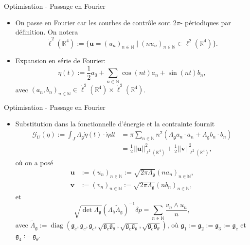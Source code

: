 \documentclass[10pt, envcountsect]{beamer}
\theoremstyle{plain}
\newcommand{\N}{\mathbb{N}}
\newcommand{\R}{\mathbb{R}}
\DeclareMathOperator{\diag}{diag}
\begin{document}
\begin{frame}{Optimisation - Passage en Fourier}
\begin{itemize}
\item On passe en Fourier car les courbes de contrôle sont $2 \pi$- périodiques par définition. On notera
\begin{equation}
\dot{\ell}^2(\R^4) := \{\mathbf{u} = (u_n)_{n \in \N} \mid (n u_n)_{n \in \N} \in \ell^2(\R^4)\}.
\end{equation}

\item Expansion en série de Fourier:
\begin{equation}
\eta(t) := \frac{1}{2} a_0 + \sum_{n \in \N} \cos(nt) a_n + \sin(n t) b_n,
\end{equation}
avec $(a_n, b_n)_{n \in \N} \in \dot{\ell}^2(\R^4) \times \dot{\ell}^2(\R^4)$.
\end{itemize}
\end{frame}

\begin{frame}{Optimisation - Passage en Fourier}
\begin{itemize}
\item Substitution dans la fonctionnelle d'énergie et la contrainte fournit
\begin{align}
\mathcal{G}_{U} (\eta) := \int_{J} \Lambda_{\mathfrak{g}} \dot{\eta}(t) \cdot \dot{\eta} dt &= \pi \sum_{n  \in \N} n^2(\Lambda_{\mathfrak{g}} a_n \cdot a_n + \Lambda_{\mathfrak{g}} b_n \cdot b_n)  \\  &=
\frac{1}{2} ||\mathbf{u}||_{\ell^2(\R^4)}^2 + \frac{1}{2} ||\mathbf{v}||_{\ell^2(\R^4)}^2,
\end{align}
où on a posé
\begin{align}
\label{eq:relation Fourier coeffs of eta}
	\mathbf{u} &:= (u_n)_{n \in \N} := \sqrt{2 \pi \Lambda_{\mathfrak{g}}}(n a_n)_{n \in \N},\\
	\mathbf{v} &:= (v_n)_{n \in \N} := \sqrt{2 \pi \Lambda_{\mathfrak{g}}} (n b_n)_{n \in \N},
\end{align}
et
\begin{equation}
\sqrt{\det \Lambda_{\mathfrak{g}}} (\Lambda_{\mathfrak{h}} \tilde{\Lambda}_{\mathfrak{g}})^{-1} \delta p = \sum_{n \in \N} \frac{v_n  \wedge u_n}{n},
\end{equation}
avec $\tilde{\Lambda}_{\mathfrak{g}} := \diag(\mathfrak{g}_c, \mathfrak{g}_c, \mathfrak{g}_c, \sqrt{\mathfrak{g}_c \mathfrak{g}_{\theta}}, \sqrt{\mathfrak{g}_c \mathfrak{g}_{\theta}}, \sqrt{\mathfrak{g}_c  \mathfrak{g}_{\theta}})$, où $\mathfrak{g}_1 :=\mathfrak{g}_2 := \mathfrak{g}_3 := \mathfrak{g}_c$ et $\mathfrak{g}_4 := \mathfrak{g}_\theta$.
\end{itemize}
\end{frame}
\end{document}
